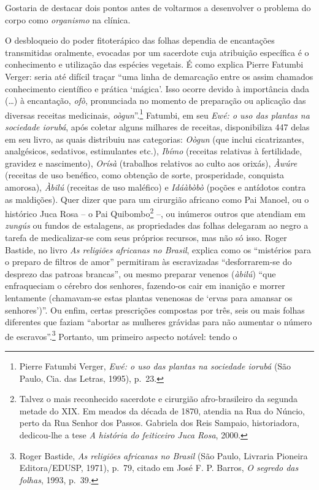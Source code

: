 Gostaria de destacar dois pontos antes de voltarmos a desenvolver o
problema do corpo como \emph{organismo} na clínica.

O desbloqueio do poder fitoterápico das folhas dependia de encantações
transmitidas oralmente, evocadas por um sacerdote cuja atribuição
específica é o conhecimento e utilização das espécies vegetais. É como
explica Pierre Fatumbi Verger: seria até difícil traçar ``uma linha de
demarcação entre os assim chamados conhecimento científico e prática
`mágica'. Isso ocorre devido à importância dada (\ldots{}) à encantação,
\emph{ofò}, pronunciada no momento de preparação ou aplicação das
diversas receitas medicinais, \emph{oògun}''.\footnote{Pierre Fatumbi
  Verger, \emph{Ewé: o uso das plantas na sociedade iorubá} (São Paulo,
  Cia. das Letras, 1995), p.~23.} Fatumbi, em seu \emph{Ewé: o uso das
plantas na sociedade iorubá}, após coletar alguns milhares de receitas,
disponibiliza 447 delas em seu livro, as quais distribuiu nas
categorias: \emph{Oògun} (que inclui cicatrizantes, analgésicos,
sedativos, estimulantes etc.), \emph{Ibímo} (receitas relativas à
fertilidade, gravidez e nascimento), \emph{Orísà} (trabalhos relativos
ao culto aos orixás), \emph{Àwúre} (receitas de uso benéfico, como
obtenção de sorte, prosperidade, conquista amorosa), \emph{Àbilú}
(receitas de uso maléfico) e \emph{Idáàbòbò} (poções e antídotos contra
as maldições). Quer dizer que para um cirurgião africano como Pai
Manoel, ou o histórico Juca Rosa -- o Pai Quibombo\footnote{Talvez o
  mais reconhecido sacerdote e cirurgião afro-brasileiro da segunda
  metade do XIX. Em meados da década de 1870, atendia na Rua do Núncio,
  perto da Rua Senhor dos Passos. Gabriela dos Reis Sampaio,
  historiadora, dedicou-lhe a tese \emph{A história do feiticeiro Juca
  Rosa}, 2000.} --, ou inúmeros outros que atendiam em \emph{zungús} ou
fundos de estalagens, as propriedades das folhas delegaram ao negro a
tarefa de medicalizar-se com seus próprios recursos, mas não só isso.
Roger Bastide, no livro \emph{As religiões africanas no Brasil}, explica
como os ``mistérios para o preparo de filtros de amor'' permitiram às
escravizadas ``desforrarem-se do desprezo das patroas brancas'', ou
mesmo preparar venenos (\emph{àbilú}) ``que enfraqueciam o cérebro dos
senhores, fazendo-os cair em inanição e morrer lentamente (chamavam-se
estas plantas venenosas de `ervas para amansar os senhores')''. Ou
enfim, certas prescrições compostas por três, seis ou mais folhas
diferentes que faziam ``abortar as mulheres grávidas para não aumentar o
número de escravos''.\footnote{Roger Bastide, \emph{As religiões
  africanas no Brasil} (São Paulo, Livraria Pioneira Editora/EDUSP,
  1971), p.~79, citado em José F. P. Barros, \emph{O segredo das
  folhas}, 1993, p.~39.} Portanto, um primeiro aspecto notável: tendo o

